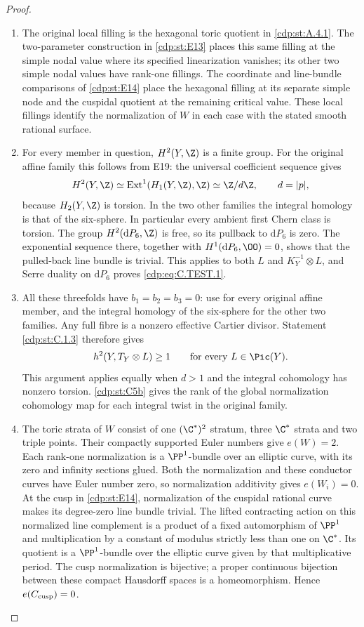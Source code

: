 \begin{proof}

\begin{enumerate}[label=\arabic*.,leftmargin=*]
\item The original local filling is the hexagonal toric quotient
in \ref{cdp:st:A.4.1}. The two-parameter construction in \ref{cdp:st:E13} places this
same filling at the simple nodal value where its specified
linearization vanishes; its other two simple nodal values
have rank-one fillings. The coordinate and line-bundle
comparisons of \ref{cdp:st:E14} place the hexagonal filling at its
separate simple node and the cuspidal quotient at the
remaining critical value. These local fillings identify the normalization of $W$ in each case
with the stated smooth rational surface.

\item For every member in question, $H^2(Y,\Z)$ is a finite
group. For the original affine family this follows from E19:
the universal coefficient sequence gives
\[
 H^2(Y,\Z)\simeq\operatorname{Ext}^1(H_1(Y,\Z),\Z)
 \simeq\Z/d\Z,\qquad d=|p|,
\]
because $H_2(Y,\Z)$ is torsion. In the two other families
the integral homology is that of the six-sphere. In
particular every ambient first Chern class is torsion.
The group $H^2(\mathrm dP_6,\Z)$ is free, so its pullback
to $\mathrm dP_6$ is zero. The exponential sequence there,
together with $H^1(\mathrm dP_6,\OO)=0$, shows that the
pulled-back line bundle is trivial. This applies to both
$L$ and $K_Y^{-1}\otimes L$, and Serre duality on
$\mathrm dP_6$ proves \eqref{cdp:eq:C.TEST.1}.

\item All these threefolds have $b_1=b_2=b_3=0$: use  for
every original affine member, and the integral homology
of the six-sphere for the other two families. Any full
fibre is a nonzero effective Cartier divisor. Statement
\ref{cdp:st:C.1.3} therefore gives
\[
 h^2(Y,T_Y\otimes L)\geq 1
 \qquad\text{for every }L\in\Pic(Y).
\]
This argument applies equally when $d>1$ and the integral
cohomology has nonzero torsion. \ref{cdp:st:C5b} gives the rank of the global normalization
cohomology map for each integral twist in the original family.

\item The toric strata of $W$ consist of one $(\C^*)^2$ stratum,
three $\C^*$ strata and two triple points. Their compactly
supported Euler numbers give $e(W)=2$.
Each rank-one normalization is a $\PP^1$-bundle over an
elliptic curve, with its zero and infinity sections glued.
Both the normalization and these conductor curves have
Euler number zero, so normalization additivity gives
$e(W_i)=0$. At the cusp in \ref{cdp:st:E14}, normalization of the
cuspidal rational curve makes its degree-zero line bundle
trivial. The lifted contracting action on this normalized
line complement is a product of a fixed automorphism of
$\PP^1$ and multiplication by a constant of modulus
strictly less than one on $\C^*$. Its quotient is a
$\PP^1$-bundle over the elliptic curve given by that
multiplicative period. The cusp normalization is
bijective; a proper continuous bijection between these
compact Hausdorff spaces is a homeomorphism. Hence
$e(C_{\rm cusp})=0$.


\end{enumerate}
\end{proof}
